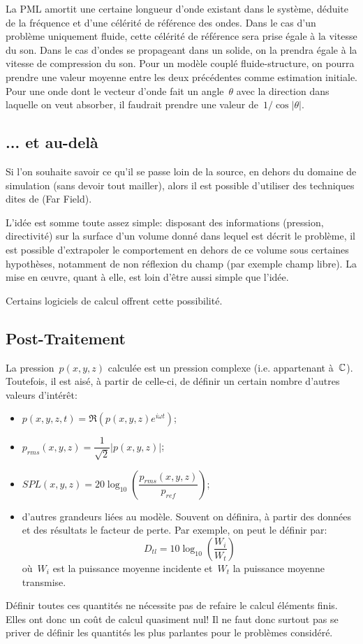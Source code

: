 La PML amortit une certaine longueur d'onde existant dans le système, déduite de la fréquence et d'une célérité de référence des ondes.
Dans le cas d'un problème uniquement fluide, cette célérité de référence sera prise égale à la vitesse du son. Dans le cas d'ondes se propageant dans un solide, on la prendra égale à la vitesse de compression du son. Pour un modèle couplé fluide-structure, on pourra prendre une valeur moyenne entre les deux précédentes comme estimation initiale. Pour une onde dont le vecteur d'onde fait un angle~$\theta$ avec la direction dans laquelle on veut absorber, il faudrait prendre une valeur de~$1/\cos|\theta|$.


\medskip
\subsection{... et au-delà}

Si l'on souhaite savoir ce qu'il se passe loin de la source, en dehors du domaine de simulation (sans devoir tout mailler), alors il est possible d'utiliser des techniques dites de  (Far Field).

L'idée est somme toute assez simple: disposant des informations (pression, directivité) sur la surface d'un volume donné dans lequel est décrit le problème, il est possible d'extrapoler le comportement en dehors de ce volume sous certaines hypothèses, notamment de non réflexion du champ (par exemple champ libre). La mise en œuvre, quant à elle, est loin d'être aussi simple que l'idée.

Certains logiciels de calcul offrent cette possibilité.


\medskip
\subsection{Post-Traitement}

La pression~$p(x,y,z)$ calculée est un pression complexe (i.e. appartenant à~$\mathbb C$).
Toutefois, il est aisé, à partir de celle-ci, de définir un certain nombre d'autres valeurs d'intérêt:
\begin{itemize}
   \item $p(x,y,z,t)=\Re\left(p(x,y,z)e^{i\omega t}\right)$;
   \item $p_{rms}(x,y,z)=\dfrac{1}{\sqrt{2}}|p(x,y,z)|$;
   \item $SPL(x,y,z)=20\log_{10}\left(\dfrac{p_{rms}(x,y,z)}{p_{ref}}\right)$;
   \item d'autres grandeurs liées au modèle. Souvent on définira, à partir des données et des résultats le facteur de perte. Par exemple, on peut le définir par:
   \begin{equation}\label{Eq-FacPerte}
   D_{tl} = 10\log_{10}\left(\dfrac{W_i}{W_t}\right)
   \end{equation}
   où~$W_i$ est la puissance moyenne incidente et~$W_t$ la puissance moyenne transmise.
\end{itemize}
Définir toutes ces quantités ne nécessite pas de refaire le calcul éléments finis. Elles ont donc un coût de calcul quasiment nul! Il ne faut donc surtout pas se priver de définir les quantités les plus parlantes pour le problèmes considéré.


